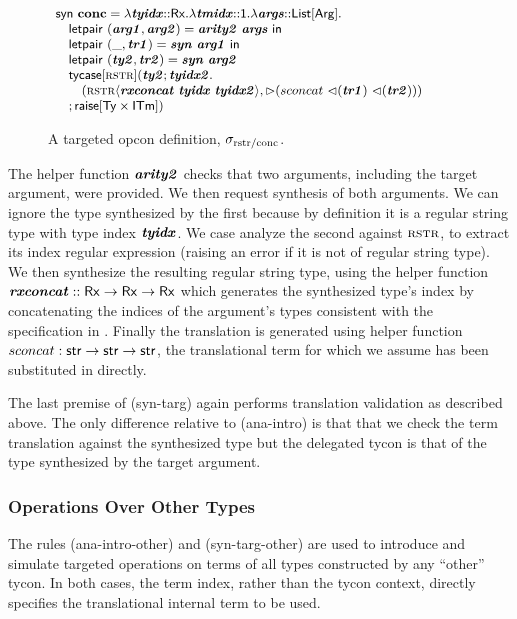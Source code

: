 \begin{figure}[t]
$\small\begin{array}{l}
\keyw{syn}~\opname{conc}=\slam{\krx}{\svar{tyidx}}{
    \slam{\kunit}{\svar{tmidx}}{
        \slam{\kargs}{\svar{args}}{\\
            \quad \keyw{letpair}~(\svar{arg1}, \svar{arg2}) = \svar{arity2}~\svar{args}~\keyw{in}\\
            \quad \keyw{letpair}~(\_, \svar{tr1}) = \svar{syn}~\svar{arg1}~\keyw{in}~  \\\quad\keyw{letpair}~(\svar{ty2}, \svar{tr2}) = \svar{syn}~\svar{arg2}\\
            \quad \stycase{\tcvar{rstr}}{\svar{ty2}}{\svar{tyidx2}}{\\
                \quad\quad (\sty{\tcvar{rstr}}{\svar{rxconcat}~\svar{tyidx}~\svar{tyidx2}}, \sqitm{sconcat~\quq{\svar{tr1}}~\quq{\svar{tr2}}})\\
                \quad
            }{\sraise{\kty\times\kitm}}
        }
    }
}
\end{array}
$
\caption{A targeted opcon definition, $\stx{rstr/conc}$.}
\label{fig:example-conc}
\vspace{-8px}
\end{figure}
The helper function $\svar{arity2}$ checks that two arguments, including the target argument, were provided. We then request synthesis of both arguments. We can ignore the type synthesized by the first because by definition it is a regular string type with type index $\svar{tyidx}$. We case analyze the second against $\tcvar{rstr}$, to extract its index regular expression (raising an error if it is not of regular string type). We then synthesize the resulting regular string type, using the helper function $\svar{rxconcat} :: \krx \rightarrow \krx \rightarrow \krx$ which generates the synthesized type's  index by concatenating the indices of the argument's types consistent with the specification in \cite{sanitation-psp14}. Finally the translation is generated using helper function $sconcat : \keyw{str} \rightarrow \keyw{str} \rightarrow \keyw{str}$, the translational term for which we assume has been substituted in directly.

The last premise of (syn-targ) again performs translation validation as described above. The only difference relative to (ana-intro) is that that we check the term translation against the synthesized type but the delegated tycon is that of the type synthesized by the target argument.

\subsubsection{Operations Over Other Types}
\noindent
The rules (ana-intro-other) and (syn-targ-other) are used to introduce and simulate targeted operations on terms of all types constructed by any ``other'' tycon. In both cases, the term index, rather than the tycon context, directly specifies the translational internal term to be used. %

